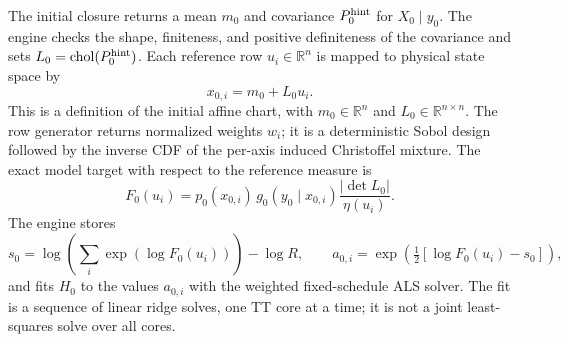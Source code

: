 \documentclass[11pt]{article}
\begin{document}
The initial closure returns a mean $m_0$ and covariance $P_0^{\rm hint}$ for
$X_0\mid y_0$.  The engine checks the shape, finiteness, and positive
definiteness of the covariance and sets
$L_0=\operatorname{chol}(P_0^{\rm hint})$.  Each reference row
$u_i\in\mathbb R^n$ is mapped to physical state space by
\begin{equation}
  x_{0,i}=m_0+L_0u_i.
  \label{eq:actual-initial-map}
\end{equation}
This is a definition of the initial affine chart, with
$m_0\in\mathbb R^n$ and $L_0\in\mathbb R^{n\times n}$.
The row generator returns normalized weights $w_i$; it is a deterministic
Sobol design followed by the inverse CDF of the per-axis induced Christoffel
mixture.  The exact model target with respect to the reference measure is
\begin{equation}
  F_0(u_i)=
  p_0(x_{0,i})\,g_0(y_0\mid x_{0,i})
  \frac{|\det L_0|}{\eta(u_i)}.
  \label{eq:actual-initial-target}
\end{equation}
The engine stores
\begin{equation}
  s_0=\log\!\left(\sum_i\exp(\log F_0(u_i))\right)-\log R,
  \qquad
  a_{0,i}=\exp\!\left(\tfrac12[\log F_0(u_i)-s_0]\right),
  \label{eq:actual-initial-scale}
\end{equation}
and fits $H_0$ to the values $a_{0,i}$ with the weighted fixed-schedule ALS
solver.  The fit is a sequence of linear ridge solves, one TT core at a time;
it is not a joint least-squares solve over all cores.
\end{document}
